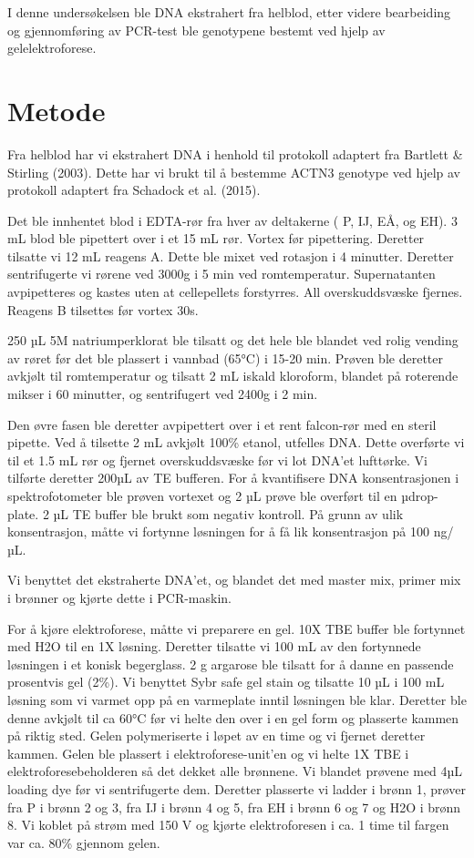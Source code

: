 \documentclass[
  letterpaper,
  DIV=11,
  numbers=noendperiod]{scrreprt}
\begin{document}
I denne undersøkelsen ble DNA ekstrahert fra helblod, etter videre
bearbeiding og gjennomføring av PCR-test ble genotypene bestemt ved
hjelp av gelelektroforese.

\hypertarget{metode}{%
\section{\texorpdfstring{\textbf{Metode}}{Metode}}\label{metode}}

Fra helblod har vi ekstrahert DNA i henhold til protokoll adaptert fra
Bartlett \& Stirling (2003). Dette har vi brukt til å bestemme ACTN3
genotype ved hjelp av protokoll adaptert fra Schadock et al. (2015).

Det ble innhentet blod i EDTA-rør fra hver av deltakerne ( P, IJ, EÅ, og
EH). 3 mL blod ble pipettert over i et 15 mL rør. Vortex før
pipettering. Deretter tilsatte vi 12 mL reagens A. Dette ble mixet ved
rotasjon i 4 minutter. Deretter sentrifugerte vi rørene ved 3000g i 5
min ved romtemperatur. Supernatanten avpipetteres og kastes uten at
cellepellets forstyrres. All overskuddsvæske fjernes. Reagens B
tilsettes før vortex 30s.

250 µL 5M natriumperklorat ble tilsatt og det hele ble blandet ved rolig
vending av røret før det ble plassert i vannbad (65°C) i 15-20 min.
Prøven ble deretter avkjølt til romtemperatur og tilsatt 2 mL iskald
kloroform, blandet på roterende mikser i 60 minutter, og sentrifugert
ved 2400g i 2 min.

Den øvre fasen ble deretter avpipettert over i et rent falcon-rør med en
steril pipette. Ved å tilsette 2 mL avkjølt 100\% etanol, utfelles DNA.
Dette overførte vi til et 1.5 mL rør og fjernet overskuddsvæske før vi
lot DNA'et lufttørke. Vi tilførte deretter 200µL av TE bufferen. For å
kvantifisere DNA konsentrasjonen i spektrofotometer ble prøven vortexet
og 2 µL prøve ble overført til en µdrop-plate. 2 µL TE buffer ble brukt
som negativ kontroll. På grunn av ulik konsentrasjon, måtte vi fortynne
løsningen for å få lik konsentrasjon på 100 ng/µL.

Vi benyttet det ekstraherte DNA'et, og blandet det med master mix,
primer mix i brønner og kjørte dette i PCR-maskin.

For å kjøre elektroforese, måtte vi preparere en gel. 10X TBE buffer ble
fortynnet med H2O til en 1X løsning. Deretter tilsatte vi 100 mL av den
fortynnede løsningen i et konisk begerglass. 2 g argarose ble tilsatt
for å danne en passende prosentvis gel (2\%). Vi benyttet Sybr safe gel
stain og tilsatte 10 µL i 100 mL løsning som vi varmet opp på en
varmeplate inntil løsningen ble klar. Deretter ble denne avkjølt til ca
60°C før vi helte den over i en gel form og plasserte kammen på riktig
sted. Gelen polymeriserte i løpet av en time og vi fjernet deretter
kammen. Gelen ble plassert i elektroforese-unit'en og vi helte 1X TBE i
elektroforesebeholderen så det dekket alle brønnene. Vi blandet prøvene
med 4µL loading dye før vi sentrifugerte dem. Deretter plasserte vi
ladder i brønn 1, prøver fra P i brønn 2 og 3, fra IJ i brønn 4 og 5,
fra EH i brønn 6 og 7 og H2O i brønn 8. Vi koblet på strøm med 150 V og
kjørte elektroforesen i ca. 1 time til fargen var ca. 80\% gjennom
gelen.
\end{document}
